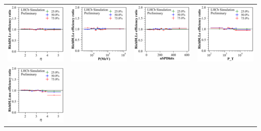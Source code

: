 \documentclass[oneside]{book}
\begin{document}
\begin{tabular}{l@{\hskip -0.0in}c@{\hskip -0.0in}c@{\hskip -0.0in}c}
\vspace{-0.2cm}
\includegraphics[width=0.3\linewidth]{eff_ratio_RichDLLe_vs_Brunel_ETA_at_[0.05, 0.1, 0.25, 0.5, 0.75, 0.9, 0.95].pdf} &
\includegraphics[width=0.3\linewidth]{eff_ratio_RichDLLe_vs_Brunel_P_at_[0.05, 0.1, 0.25, 0.5, 0.75, 0.9, 0.95].pdf} &
\includegraphics[width=0.3\linewidth]{eff_ratio_RichDLLe_vs_nSPDhits_at_[0.05, 0.1, 0.25, 0.5, 0.75, 0.9, 0.95].pdf} &
\includegraphics[width=0.3\linewidth]{eff_ratio_RichDLLe_vs_P_T_at_[0.05, 0.1, 0.25, 0.5, 0.75, 0.9, 0.95].pdf}\\
\vspace{-0.2cm}
\includegraphics[width=0.32\linewidth]{eff_ratio_RichDLLmu_vs_Brunel_ETA_at_[0.05, 0.1, 0.25, 0.5, 0.75, 0.9, 0.95].pdf} &

\end{tabular}
\end{document}
